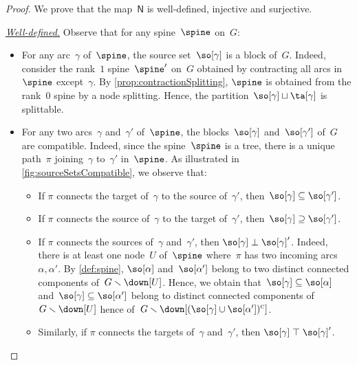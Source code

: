 \documentclass{amsart}
\theoremstyle{definition}
\newcommand{\ssm}{\smallsetminus} %
\newcommand{\para}[1]{\medskip\noindent\uline{\textit{#1.}}} %
\newcommand{\vincent}[1]{\todo[color=blue!30]{#1 \\ \hfill --- V.}}
\newcommand{\negDisjoint}{\perp} %
\newcommand{\posDisjoint}{\;\top\;} %
\newcommand{\compl}[1]{#1{}^\textsc{c}} %
\newcommand{\spineToNested}{\mathsf{N}} %
\begin{document}
\begin{proof}
  We prove that the map~$\spineToNested$ is well-defined, injective and surjective.
  
  \para{Well-defined}
  Observe that for any spine~$\spine$ on~$G$:
  \begin{itemize}
    \item For any arc~$\gamma$ of~$\spine$, the source set~$\so[\gamma]$ is a block of~$G$. 
    Indeed, consider the rank~$1$ spine~$\spine'$ on~$G$ obtained by contracting all arcs in~$\spine$ except~$\gamma$. 
    By \cref{prop:contractionSplitting}, $\spine$ is obtained from the rank~$0$ spine by a node splitting. 
    Hence, the partition~$\so[\gamma] \sqcup \ta[\gamma]$ is splittable.
    \item For any two arcs~$\gamma$ and~$\gamma'$ of~$\spine$, the blocks~$\so[\gamma]$ and~$\so[\gamma']$ of~$G$ are compatible. 
    Indeed, since the spine~$\spine$ is a tree, there is a unique path~$\pi$ joining~$\gamma$ to~$\gamma'$ in~$\spine$.
    As illustrated in \cref{fig:sourceSetsCompatible}, we observe that:
    \vincent{borrow picture...}
    \begin{itemize}
      \item If $\pi$ connects the target of~$\gamma$ to the source of~$\gamma'$, then~$\so[\gamma] \subseteq \so[\gamma']$.
      \item If $\pi$ connects the source of~$\gamma$ to the target of~$\gamma'$, then~$\so[\gamma] \supseteq \so[\gamma']$.
      \item If $\pi$ connects the sources of~$\gamma$ and~$\gamma'$, then $\so[\gamma] \negDisjoint \so[\gamma]'$.
      Indeed, there is at least one node~$U$ of~$\spine$ where~$\pi$ has two incoming arcs~$\alpha, \alpha'$.
      By \cref{def:spine}, $\so[\alpha]$ and~$\so[\alpha']$ belong to two distinct connected components of~$G \ssm \down[U]$.
      Hence, we obtain that~$\so[\gamma] \subseteq \so[\alpha]$ and~$\so[\gamma] \subseteq \so[\alpha']$ belong to distinct connected components of~$G \ssm \down[U]$ hence of~$G \ssm \down[\compl{(\so[\gamma] \cup \so[\alpha'])}]$.
      \item Similarly, if $\pi$ connects the targets of~$\gamma$ and~$\gamma'$, then $\so[\gamma] \posDisjoint \so[\gamma]'$.
    \end{itemize}
  \end{itemize}


\end{proof}
\end{document}
